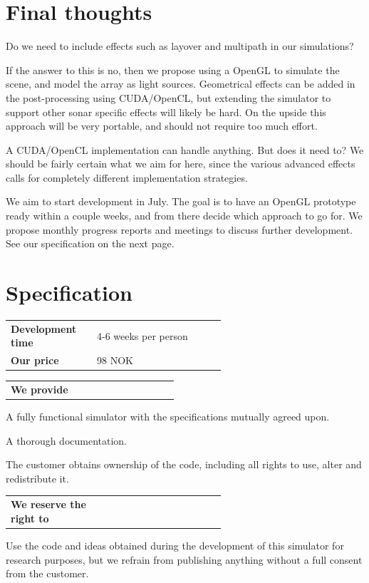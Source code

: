 \documentclass[
   article                                      %
 , 12pt                                         %
 , xelatex                                      %
 , bibtex                                       %
 , layout
]{common/mytemplate}
\begin{document}
\section{Final thoughts}

Do we need to include effects such as layover and multipath in our simulations?

If the answer to this is no, then we propose using a OpenGL to simulate the scene, and model the array as light sources. Geometrical effects can be added in the post-processing using CUDA/OpenCL, but extending the simulator to support other sonar specific effects will likely be hard. On the upside this approach will be very portable, and should not require too much effort.

A CUDA/OpenCL implementation can handle anything. But does it need to? We should be fairly certain what we aim for here, since the various advanced effects calls for completely different implementation strategies.

We aim to start development in July. The goal is to have an OpenGL prototype ready within a couple weeks, and from there decide which approach to go for. We propose monthly progress reports and meetings to discuss further development. See our specification on the next page.

\newpage

\section{Specification}


\begin{tabular}[c]{>{\bf}l p{0.6\linewidth}}
Development time       & 4-6 weeks per person  \\
Our price              & 98\;000 NOK
\end{tabular}

\begin{tabular}[c]{>{\bf}l p{0.6\linewidth}}
We provide        &
\end{tabular}
\begin{itemize0}
\item A fully functional simulator with the specifications mutually agreed upon.
\item A thorough documentation.
\item The customer obtains ownership of the code, including all rights to use, alter and redistribute it.
\end{itemize0}
\begin{tabular}[c]{>{\bf}l p{0.6\linewidth}}
We reserve the right to &
\end{tabular}
\begin{itemize0}
\item Use the code and ideas obtained during the development of this simulator for research purposes, but we refrain from publishing anything without a full consent from the customer.
\end{itemize0}
\end{document}
